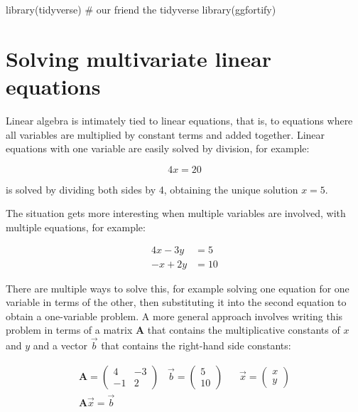 \documentclass[
  letterpaper,
  DIV=11,
  numbers=noendperiod]{scrreprt}
\newenvironment{Shaded}{\begin{snugshade}}{\end{snugshade}}
\newcommand{\CommentTok}[1]{\textcolor[rgb]{0.37,0.37,0.37}{#1}}
\newcommand{\FunctionTok}[1]{\textcolor[rgb]{0.28,0.35,0.67}{#1}}
\newcommand{\NormalTok}[1]{\textcolor[rgb]{0.00,0.23,0.31}{#1}}
\begin{document}
\begin{Shaded}
\begin{Highlighting}[]
\FunctionTok{library}\NormalTok{(tidyverse) }\CommentTok{\# our friend the tidyverse}
\FunctionTok{library}\NormalTok{(ggfortify) }
\end{Highlighting}
\end{Shaded}

\hypertarget{solving-multivariate-linear-equations}{%
\section{Solving multivariate linear
equations}\label{solving-multivariate-linear-equations}}

Linear algebra is intimately tied to linear equations, that is, to
equations where all variables are multiplied by constant terms and added
together. Linear equations with one variable are easily solved by
division, for example:

\[
4x = 20
\]

is solved by dividing both sides by 4, obtaining the unique solution
\(x=5\).

The situation gets more interesting when multiple variables are
involved, with multiple equations, for example:

\[
\begin{aligned}
4x - 3y &= 5 \\
 -x + 2y &= 10
\end{aligned}
\]

There are multiple ways to solve this, for example solving one equation
for one variable in terms of the other, then substituting it into the
second equation to obtain a one-variable problem. A more general
approach involves writing this problem in terms of a matrix
\(\mathbf A\) that contains the multiplicative constants of \(x\) and
\(y\) and a vector \(\vec b\) that contains the right-hand side
constants:

\[
\begin{aligned}
\mathbf{A} = \begin{pmatrix} 4 & -3 \\ -1 & 2 \end{pmatrix} \;\;\; \vec{b} = \begin{pmatrix}5 \\ 10 \end{pmatrix} &\;\;\;
\vec{x} = \begin{pmatrix} x \\ y \end{pmatrix} \\
\mathbf{A} \vec x = \vec b &
\end{aligned}
\]
\end{document}
